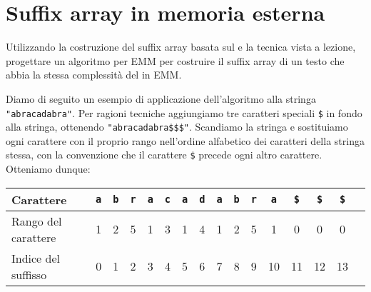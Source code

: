 \chapter{Suffix array in memoria esterna}

\begin{problem*}
  Utilizzando la costruzione del suffix array basata sul \mergesort e la tecnica
  \dc vista a lezione, progettare un algoritmo per EMM per costruire il suffix
  array di un testo che abbia la stessa complessit\`a del \mergesort in EMM.
\end{problem*}

Diamo di seguito un esempio di applicazione dell'algoritmo \dc alla stringa
\texttt{\string"abracadabra\string"}. Per ragioni tecniche aggiungiamo tre 
caratteri speciali \texttt{\$} in fondo alla stringa, ottenendo 
\texttt{\string"abracadabra\$\$\$\string"}. Scandiamo la stringa e sostituiamo 
ogni carattere con il proprio rango nell'ordine alfabetico dei caratteri della 
stringa stessa, con la convenzione che il carattere \texttt{\$} precede ogni altro 
carattere. Otteniamo dunque:
\begin{table}[h]
  \begin{tabular}{l*{14}{c}r}
    Carattere              & \texttt{a} & \texttt{b} & \texttt{r} & \texttt{a}
                           & \texttt{c} & \texttt{a} & \texttt{d} & \texttt{a}
                           & \texttt{b} & \texttt{r} & \texttt{a} & \texttt{\$}
                           & \texttt{\$} & \texttt{\$} \\
    \hline
    Rango del carattere    & 1 & 2 & 5 & 1 & 3 & 1 & 4 & 1 & 2 & 5 & 1 & 0 & 0 & 0 \\
    Indice del suffisso    & 0 & 1 & 2 & 3 & 4 & 5 & 6 & 7 & 8 & 9 & 10 & 11 & 12 & 13 \\
  \end{tabular}
\end{table}

